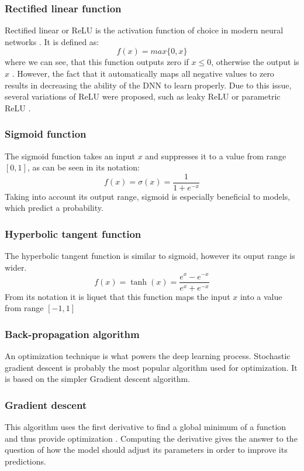 \subsubsection*{Rectified linear function}
Rectified linear or ReLU is the activation function of choice in modern neural networks \cite{tutorialIEEE}. It is defined as:
\begin{equation}
     f(x) = max\{0, x\}
\end{equation}
where we can see, that this function outputs zero if $x\leq0$, otherwise the output is $x$ \cite{deeplearningbook}. However, the fact that it automatically maps all negative values to zero results in decreasing the ability of the DNN to learn properly. Due to this issue, several variations of ReLU were proposed, such as leaky ReLU or parametric ReLU \cite{tutorialIEEE}.

\subsubsection*{Sigmoid function}
The sigmoid function takes an input $x$ and suppresses it to a value from range $[0,1]$, as can be seen in its notation:
\begin{equation}
    f(x) = \sigma(x)=\frac{1}{1+e^{-x}}
\end{equation}
Taking into account its output range, sigmoid is especially beneficial to models, which predict a probability.

\subsubsection*{Hyperbolic tangent function}
The hyperbolic tangent function is similar to sigmoid, however its ouput range is wider. 
\begin{equation}
    f(x) = \tanh(x)=\frac{e^x-e^{-x}}{e^x+e^{-x}}
\end{equation}
From its notation it is liquet that this function maps the input $x$ into a value from range $[-1,1]$
\subsubsection{Back-propagation algorithm}
An optimization technique is what powers the deep learning process. Stochastic gradient descent is probably the most popular algorithm used for optimization. It is based on the simpler Gradient descent algorithm.
\subsubsection*{Gradient descent}
This algorithm uses the first derivative to find a global minimum of a function and thus provide optimization \cite{deeplearningbook}. Computing the derivative gives the answer to the question of how the model should adjust its parameters in order to improve its predictions.

